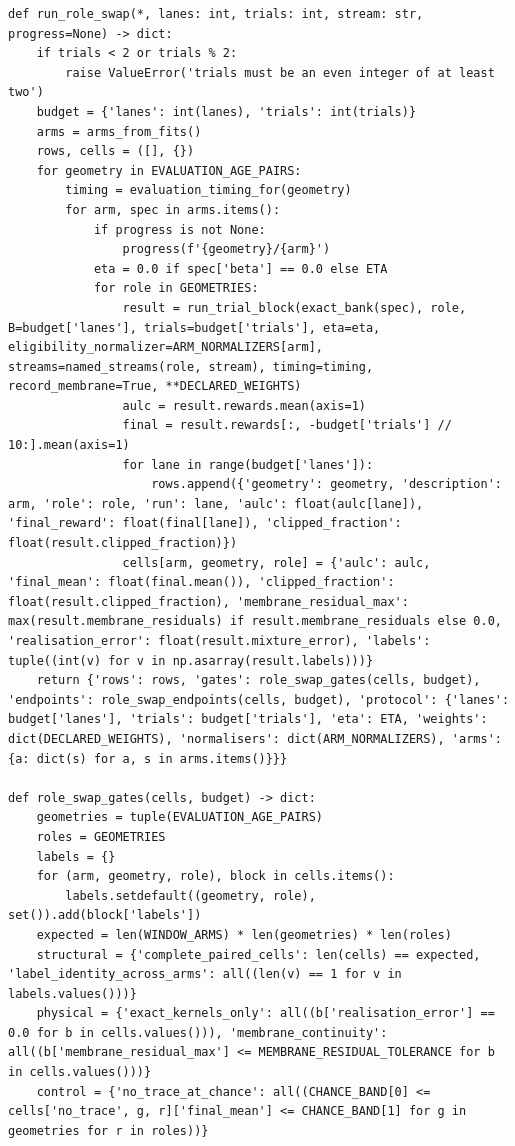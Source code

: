 \documentclass[a4paper,10pt]{article}
\begin{document}
\begin{Verbatim}
def run_role_swap(*, lanes: int, trials: int, stream: str, progress=None) -> dict:
    if trials < 2 or trials % 2:
        raise ValueError('trials must be an even integer of at least two')
    budget = {'lanes': int(lanes), 'trials': int(trials)}
    arms = arms_from_fits()
    rows, cells = ([], {})
    for geometry in EVALUATION_AGE_PAIRS:
        timing = evaluation_timing_for(geometry)
        for arm, spec in arms.items():
            if progress is not None:
                progress(f'{geometry}/{arm}')
            eta = 0.0 if spec['beta'] == 0.0 else ETA
            for role in GEOMETRIES:
                result = run_trial_block(exact_bank(spec), role, B=budget['lanes'], trials=budget['trials'], eta=eta, eligibility_normalizer=ARM_NORMALIZERS[arm], streams=named_streams(role, stream), timing=timing, record_membrane=True, **DECLARED_WEIGHTS)
                aulc = result.rewards.mean(axis=1)
                final = result.rewards[:, -budget['trials'] // 10:].mean(axis=1)
                for lane in range(budget['lanes']):
                    rows.append({'geometry': geometry, 'description': arm, 'role': role, 'run': lane, 'aulc': float(aulc[lane]), 'final_reward': float(final[lane]), 'clipped_fraction': float(result.clipped_fraction)})
                cells[arm, geometry, role] = {'aulc': aulc, 'final_mean': float(final.mean()), 'clipped_fraction': float(result.clipped_fraction), 'membrane_residual_max': max(result.membrane_residuals) if result.membrane_residuals else 0.0, 'realisation_error': float(result.mixture_error), 'labels': tuple((int(v) for v in np.asarray(result.labels)))}
    return {'rows': rows, 'gates': role_swap_gates(cells, budget), 'endpoints': role_swap_endpoints(cells, budget), 'protocol': {'lanes': budget['lanes'], 'trials': budget['trials'], 'eta': ETA, 'weights': dict(DECLARED_WEIGHTS), 'normalisers': dict(ARM_NORMALIZERS), 'arms': {a: dict(s) for a, s in arms.items()}}}

def role_swap_gates(cells, budget) -> dict:
    geometries = tuple(EVALUATION_AGE_PAIRS)
    roles = GEOMETRIES
    labels = {}
    for (arm, geometry, role), block in cells.items():
        labels.setdefault((geometry, role), set()).add(block['labels'])
    expected = len(WINDOW_ARMS) * len(geometries) * len(roles)
    structural = {'complete_paired_cells': len(cells) == expected, 'label_identity_across_arms': all((len(v) == 1 for v in labels.values()))}
    physical = {'exact_kernels_only': all((b['realisation_error'] == 0.0 for b in cells.values())), 'membrane_continuity': all((b['membrane_residual_max'] <= MEMBRANE_RESIDUAL_TOLERANCE for b in cells.values()))}
    control = {'no_trace_at_chance': all((CHANCE_BAND[0] <= cells['no_trace', g, r]['final_mean'] <= CHANCE_BAND[1] for g in geometries for r in roles))}


\end{Verbatim}
\end{document}
